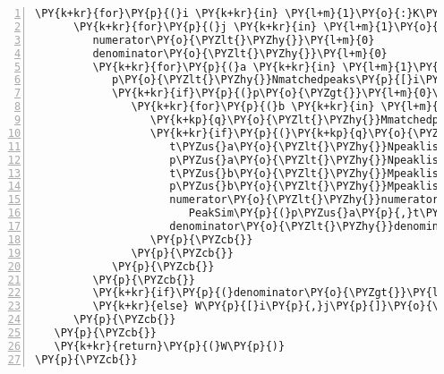 \begin{Verbatim}[commandchars=\\\{\},codes={\catcode`\$=3\catcode`\^=7\catcode`\_=8},gobble=0,numbers=left,fontfamily=fvm,fontshape=n,fontsize=\footnotesize,tabsize=2]
   \PY{k+kr}{for}\PY{p}{(}i \PY{k+kr}{in} \PY{l+m}{1}\PY{o}{:}K\PY{p}{)}\PY{p}{\PYZob{}}
      \PY{k+kr}{for}\PY{p}{(}j \PY{k+kr}{in} \PY{l+m}{1}\PY{o}{:}L\PY{p}{)}\PY{p}{\PYZob{}}
         numerator\PY{o}{\PYZlt{}\PYZhy{}}\PY{l+m}{0}
         denominator\PY{o}{\PYZlt{}\PYZhy{}}\PY{l+m}{0}
         \PY{k+kr}{for}\PY{p}{(}a \PY{k+kr}{in} \PY{l+m}{1}\PY{o}{:}N\PY{p}{)}\PY{p}{\PYZob{}}
            p\PY{o}{\PYZlt{}\PYZhy{}}Nmatchedpeaks\PY{p}{[}i\PY{p}{,}a\PY{p}{]}
            \PY{k+kr}{if}\PY{p}{(}p\PY{o}{\PYZgt{}}\PY{l+m}{0}\PY{p}{)}\PY{p}{\PYZob{}}
               \PY{k+kr}{for}\PY{p}{(}b \PY{k+kr}{in} \PY{l+m}{1}\PY{o}{:}M\PY{p}{)}\PY{p}{\PYZob{}}
                  \PY{k+kp}{q}\PY{o}{\PYZlt{}\PYZhy{}}Mmatchedpeaks\PY{p}{[}j\PY{p}{,}b\PY{p}{]}
                  \PY{k+kr}{if}\PY{p}{(}\PY{k+kp}{q}\PY{o}{\PYZgt{}}\PY{l+m}{0}\PY{p}{)}\PY{p}{\PYZob{}}
                     t\PYZus{}a\PY{o}{\PYZlt{}\PYZhy{}}Npeaklists\PY{p}{[[}a\PY{p}{]]}\PY{p}{[}\PY{l+m}{1}\PY{p}{,}p\PY{p}{]}
                     p\PYZus{}a\PY{o}{\PYZlt{}\PYZhy{}}Npeaklists\PY{p}{[[}a\PY{p}{]]}\PY{p}{[}\PY{l+m}{\PYZhy{}1}\PY{p}{,}p\PY{p}{]}
                     t\PYZus{}b\PY{o}{\PYZlt{}\PYZhy{}}Mpeaklists\PY{p}{[[}b\PY{p}{]]}\PY{p}{[}\PY{l+m}{1}\PY{p}{,}\PY{k+kp}{q}\PY{p}{]}
                     p\PYZus{}b\PY{o}{\PYZlt{}\PYZhy{}}Mpeaklists\PY{p}{[[}b\PY{p}{]]}\PY{p}{[}\PY{l+m}{\PYZhy{}1}\PY{p}{,}\PY{k+kp}{q}\PY{p}{]}
                     numerator\PY{o}{\PYZlt{}\PYZhy{}}numerator\PY{o}{+}
                     	PeakSim\PY{p}{(}p\PYZus{}a\PY{p}{,}t\PYZus{}a\PY{p}{,}p\PYZus{}b\PY{p}{,}t\PYZus{}b\PY{p}{,}D\PY{p}{,}expon\PY{p}{,}lambda\PY{p}{)}
                     denominator\PY{o}{\PYZlt{}\PYZhy{}}denominator\PY{l+m}{+1}
                  \PY{p}{\PYZcb{}}
               \PY{p}{\PYZcb{}}
            \PY{p}{\PYZcb{}}
         \PY{p}{\PYZcb{}}
         \PY{k+kr}{if}\PY{p}{(}denominator\PY{o}{\PYZgt{}}\PY{l+m}{0}\PY{p}{)} W\PY{p}{[}i\PY{p}{,}j\PY{p}{]}\PY{o}{\PYZlt{}\PYZhy{}}numerator\PY{o}{/}denominator
         \PY{k+kr}{else} W\PY{p}{[}i\PY{p}{,}j\PY{p}{]}\PY{o}{\PYZlt{}\PYZhy{}}\PY{l+m}{0}
      \PY{p}{\PYZcb{}}
   \PY{p}{\PYZcb{}}
   \PY{k+kr}{return}\PY{p}{(}W\PY{p}{)}
\PY{p}{\PYZcb{}}
\end{Verbatim}
